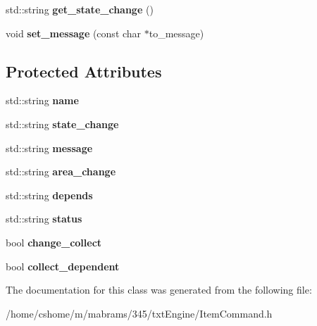 \begin{DoxyCompactItemize}
\item 
\hypertarget{class_item_command_aad1e85e694f5cd16cc11ad5acda2884e}{
std::string {\bfseries get\_\-state\_\-change} ()}
\label{class_item_command_aad1e85e694f5cd16cc11ad5acda2884e}

\item 
\hypertarget{class_item_command_abe177c8696e00480a716959b335ebca8}{
void {\bfseries set\_\-message} (const char $\ast$to\_\-message)}
\label{class_item_command_abe177c8696e00480a716959b335ebca8}

\end{DoxyCompactItemize}
\subsection*{Protected Attributes}
\begin{DoxyCompactItemize}
\item 
\hypertarget{class_item_command_ae79c7cdf02b170b78bc5967a334cdcf7}{
std::string {\bfseries name}}
\label{class_item_command_ae79c7cdf02b170b78bc5967a334cdcf7}

\item 
\hypertarget{class_item_command_a7aa339b7c9c54ca6d331b9729cf8c044}{
std::string {\bfseries state\_\-change}}
\label{class_item_command_a7aa339b7c9c54ca6d331b9729cf8c044}

\item 
\hypertarget{class_item_command_a553f91c8eae8f25ba27ed0eb875e5e19}{
std::string {\bfseries message}}
\label{class_item_command_a553f91c8eae8f25ba27ed0eb875e5e19}

\item 
\hypertarget{class_item_command_ac5fe64207c12fbd50c3a8b92207acb40}{
std::string {\bfseries area\_\-change}}
\label{class_item_command_ac5fe64207c12fbd50c3a8b92207acb40}

\item 
\hypertarget{class_item_command_a6da1ba48131d1f2c414ad4728e7bb4c2}{
std::string {\bfseries depends}}
\label{class_item_command_a6da1ba48131d1f2c414ad4728e7bb4c2}

\item 
\hypertarget{class_item_command_a46091780df5b87f52db4e851deeb2aa1}{
std::string {\bfseries status}}
\label{class_item_command_a46091780df5b87f52db4e851deeb2aa1}

\item 
\hypertarget{class_item_command_a624650b662bbb506c74f943f40c9d9ea}{
bool {\bfseries change\_\-collect}}
\label{class_item_command_a624650b662bbb506c74f943f40c9d9ea}

\item 
\hypertarget{class_item_command_a6d69129934e185fbe2e8be0db40b0f94}{
bool {\bfseries collect\_\-dependent}}
\label{class_item_command_a6d69129934e185fbe2e8be0db40b0f94}

\end{DoxyCompactItemize}


The documentation for this class was generated from the following file:\begin{DoxyCompactItemize}
\item 
/home/cshome/m/mabrams/345/txtEngine/ItemCommand.h\end{DoxyCompactItemize}
